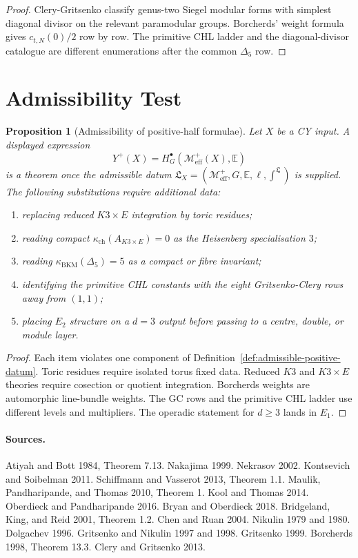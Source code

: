 \documentclass[11pt]{amsart}
\providecommand{\cM}{\mathcal{M}}
\providecommand{\kch}{\kappa_{\mathrm{ch}}}
\providecommand{\kBKM}{\kappa_{\mathrm{BKM}}}
\providecommand{\Meff}{\cM^{+}_{\mathrm{eff}}}
\providecommand{\Yp}{Y^{+}}
\theoremstyle{plain}
\newtheorem{proposition}[theorem]{Proposition}
\theoremstyle{definition}
\theoremstyle{remark}
\begin{document}
\begin{proof}
Clery-Gritsenko classify genus-two Siegel modular forms with simplest
diagonal divisor on the relevant paramodular groups. Borcherds'
weight formula gives $c_{t,N}(0)/2$ row by row. The primitive CHL ladder
and the diagonal-divisor catalogue are different enumerations after the
common $\Delta_5$ row.
\end{proof}

\section{Admissibility Test}

\begin{proposition}[Admissibility of positive-half formulae]
\label{prop:positive-half-admissibility}
Let $X$ be a CY input. A displayed expression
\[
 \Yp(X)=H^\bullet_G(\Meff(X),\mathbb E)
\]
is a theorem once the admissible datum
$\mathfrak L_X=(\Meff,G,\mathbb E,\ell,\int^{\mathfrak L})$ is supplied.
The following substitutions require additional data:
\begin{enumerate}
\item replacing reduced $K3\times E$ integration by toric residues;
\item reading compact $\kch(A_{K3\times E})=0$ as the Heisenberg
specialisation $3$;
\item reading $\kBKM(\Delta_5)=5$ as a compact or fibre invariant;
\item identifying the primitive CHL constants with the eight
Gritsenko-Clery rows away from $(1,1)$;
\item placing $E_2$ structure on a $d=3$ output before passing to a
centre, double, or module layer.
\end{enumerate}
\end{proposition}

\begin{proof}
Each item violates one component of Definition~\ref{def:admissible-positive-datum}.
Toric residues require isolated torus fixed data. Reduced $K3$ and
$K3\times E$ theories require cosection or quotient integration.
Borcherds weights are automorphic line-bundle weights. The GC rows and
the primitive CHL ladder use different levels and multipliers. The
operadic statement for $d\geq3$ lands in $E_1$.
\end{proof}

\paragraph{Sources.}
Atiyah and Bott 1984, Theorem 7.13. Nakajima 1999. Nekrasov 2002.
Kontsevich and Soibelman 2011. Schiffmann and Vasserot 2013, Theorem
1.1. Maulik, Pandharipande, and Thomas 2010, Theorem 1. Kool and
Thomas 2014. Oberdieck and Pandharipande 2016. Bryan and Oberdieck
2018. Bridgeland, King, and Reid 2001, Theorem 1.2. Chen and Ruan
2004. Nikulin 1979 and 1980. Dolgachev 1996. Gritsenko and Nikulin
1997 and 1998. Gritsenko 1999. Borcherds 1998, Theorem 13.3. Clery and
Gritsenko 2013.
\end{document}
